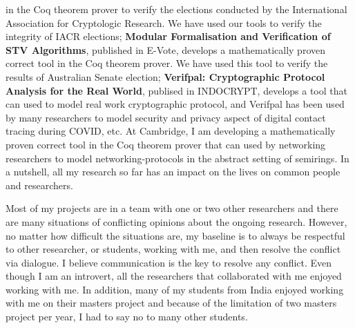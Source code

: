 \documentclass[11pt,a4paper,roman]{moderncv}
\begin{document}
in the Coq theorem prover to verify the elections conducted by 
the International Association for Cryptologic Research. We have used 
our tools to verify the integrity of IACR elections; \textbf{Modular Formalisation and 
Verification of STV Algorithms}, published in E-Vote, develops a mathematically proven 
correct tool in the Coq theorem prover. We have used this tool to verify
the results of Australian Senate election; 
\textbf{Verifpal: Cryptographic Protocol Analysis for the Real World}, publised in 
INDOCRYPT, develops a tool that can used to model real work cryptographic protocol, and 
Verifpal has been used by many researchers to model security and privacy aspect of 
digital contact tracing during COVID, etc.
At Cambridge, I am developing a mathematically proven correct tool in the Coq theorem prover 
that can used by networking researchers to model networking-protocols in the abstract 
setting of semirings.
In a nutshell, all my research so far has an impact on the lives on common people and 
researchers.  


Most of my projects are in a team with one or two other researchers and there are
many situations of conflicting opinions about the ongoing research. However, no matter 
how difficult the situations are, my baseline is to always be respectful to other 
researcher, or students, working with me, and then resolve the conflict via dialogue. I believe
communication is the key to resolve any conflict. Even though I am an introvert, 
all the researchers that collaborated with me 
enjoyed working with me. In addition, many of my students from India enjoyed working with 
me on their masters project and because of the limitation of two masters project per year, 
I had to say no to many other students.




\vspace{0.5cm}


\makeletterclosing
\end{document}
